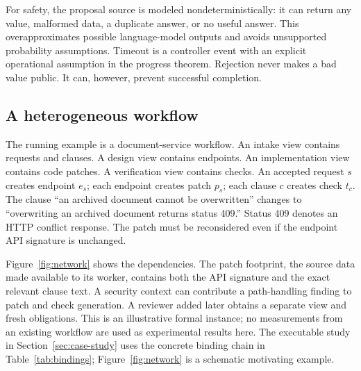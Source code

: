 \documentclass[pdflatex,sn-mathphys-num]{sn-jnl}
\theoremstyle{thmstyleone}
\theoremstyle{thmstylethree}
\theoremstyle{thmstyletwo}
\begin{document}
For safety, the proposal source is modeled nondeterministically: it can return any value, malformed data, a duplicate answer, or no useful answer. This overapproximates possible language-model outputs and avoids unsupported probability assumptions. Timeout is a controller event with an explicit operational assumption in the progress theorem. Rejection never makes a bad value public. It can, however, prevent successful completion.

\subsection{A heterogeneous workflow}
The running example is a document-service workflow. An intake view contains requests and clauses. A design view contains endpoints. An implementation view contains code patches. A verification view contains checks. An accepted request $s$ creates endpoint $e_s$; each endpoint creates patch $p_s$; each clause $c$ creates check $t_c$. The clause ``an archived document cannot be overwritten'' changes to ``overwriting an archived document returns status 409.'' Status 409 denotes an HTTP conflict response. The patch must be reconsidered even if the endpoint API signature is unchanged.

Figure~\ref{fig:network} shows the dependencies. The patch footprint, the source data made available to its worker, contains both the API signature and the exact relevant clause text. A security context can contribute a path-handling finding to patch and check generation. A reviewer added later obtains a separate view and fresh obligations. This is an illustrative formal instance; no measurements from an existing workflow are used as experimental results here. The executable study in Section~\ref{sec:case-study} uses the concrete binding chain in Table~\ref{tab:bindings}; Figure~\ref{fig:network} is a schematic motivating example.
\end{document}
